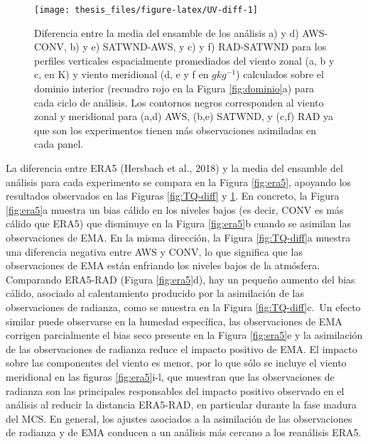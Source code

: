 \documentclass[12pt,oneside,a4paper]{reedthesis}
\begin{document}
\begin{figure}

\texttt{[image: thesis\_files/figure-latex/UV-diff-1]} \hfill{}

\caption{Diferencia entre la media del ensamble de los análisis a) y d) AWS-CONV, b) y e) SATWND-AWS, y c) y f) RAD-SATWND para los perfiles verticales espacialmente promediados del viento zonal (a, b y c, en K) y viento meridional (d, e y f en \(gkg^{-1}\)) calculados sobre el dominio interior (recuadro rojo en la Figura \ref{fig:dominio}a) para cada ciclo de análisis. Los contornos negros corresponden al viento zonal y meridional para (a,d) AWS, (b,e) SATWND, y (c,f) RAD ya que son los experimentos tienen más observaciones asimiladas en cada panel.}\label{fig:UV-diff}
\end{figure}
La diferencia entre ERA5 (Hersbach et al., 2018) y la media del ensamble del análisis para cada experimento se compara en la Figura \ref{fig:era5}, apoyando los resultados observados en las Figuras \ref{fig:TQ-diff} y \ref{fig:UV-diff}. En concreto, la Figura \ref{fig:era5}a muestra un bias cálido en los niveles bajos (es decir, CONV es más cálido que ERA5) que disminuye en la Figura \ref{fig:era5}b cuando se asimilan las observaciones de EMA. En la misma dirección, la Figura \ref{fig:TQ-diff}a muestra una diferencia negativa entre AWS y CONV, lo que significa que las observaciones de EMA están enfriando los niveles bajos de la atmósfera. Comparando ERA5-RAD (Figura \ref{fig:era5}d), hay un pequeño aumento del bias cálido, asociado al calentamiento producido por la asimilación de las observaciones de radianza, como se muestra en la Figura \ref{fig:TQ-diff}c.~Un efecto similar puede observarse en la humedad específica, las observaciones de EMA corrigen parcialmente el bias seco presente en la Figura \ref{fig:era5}e y la asimilación de las observaciones de radianza reduce el impacto positivo de EMA. El impacto sobre las componentes del viento es menor, por lo que sólo se incluye el viento meridional en las figuras \ref{fig:era5}i-l, que muestran que las observaciones de radianza son las principales responsables del impacto positivo observado en el análisis al reducir la distancia ERA5-RAD, en particular durante la fase madura del MCS. En general, los ajustes asociados a la asimilación de las observaciones de radianza y de EMA conducen a un análisis más cercano a los reanálisis ERA5.
\end{document}
